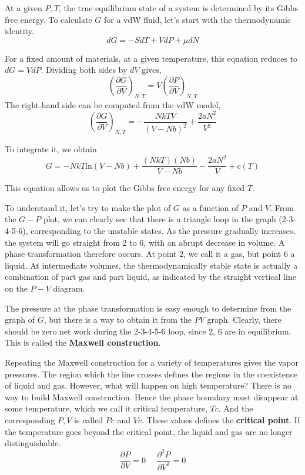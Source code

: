 At a given $P,T$, the true equilibrium state of a system is determined by its Gibbs free energy. To calculate $G$ for a vdW fluid, let's
start with the thermodynamic identity.
\begin{equation}
dG= -SdT + VdP + \mu dN
\end{equation}

For a fixed amount of materials, at a given temperature, this equation reduces to $dG=VdP$. Dividing both sides by $dV$ gives,
\begin{equation}
(\frac{\partial G}{\partial V})_{N,T} = V (\frac{\partial P}{\partial V})_{N,T} 
\end{equation}
The right-hand side can be computed from the vdW model,
\begin{equation}
(\frac{\partial G}{\partial V})_{N,T} = - \frac{NkTV}{(V-Nb)^2} + \frac{2aN^2}{V^2}
\end{equation}

To integrate it, we obtain
\begin{equation}
G = -NkT\text{ln}(V-Nb) + \frac{(NkT)(Nb)}{V-Nb} - \frac{2aN^2}{V} + c(T)
\end{equation}

This equation allows us to plot the Gibbs free energy for any fixed $T$.

To understand it, let's try to make the plot of $G$ as a function of $P$ and $V$. From the $G-P$ plot, we can clearly see that there is a
triangle loop in the graph (2-3-4-5-6), corresponding to the unstable states. As the pressure gradually increases, the system will go 
straight from 2 to 6, with an abrupt decrease in volume. A phase transformation therefore occurs. At point 2, we call it a gas, but point 6 a liquid.
At intermediate volumes, the thermodynamically stable state is actually a combination of part gas and part liquid, as indicated by the straight
vertical line on the $P-V$ diagram. 

The pressure at the phase transformation is easy enough to determine from the graph of $G$, but there is a way to obtain it from the $PV$ graph.
Clearly, there should be zero net work during the 2-3-4-5-6 loop, since 2, 6 are in equilibrium. This is called the {\bf Maxwell construction}.

Repeating the Maxwell construction for a variety of temperatures gives the vapor pressures. The region which the line crosses defines the regions in the coexistence of liquid and gas.
However, what will happen on high temperature? There is no way to build Maxwell construction. Hence the phase boundary must disappear at some temperature, which we call it critical temperature, $Tc$.
And the corresponding $P,V$ is called $Pc$ and $Vc$. These values defines the {\bf critical point}. If the temperature goes beyond the critical point, the liquid and gas are no longer distinguishable.
\begin{equation}
\frac{\partial P}{\partial V} = 0 ~~~~~~  \frac{\partial^2 P}{\partial V^2} = 0
\end{equation}

